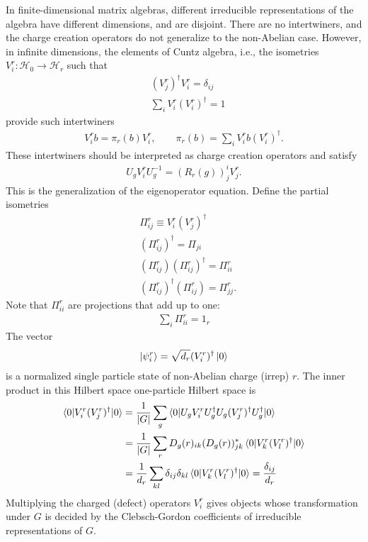 \documentclass{article}
\newcommand{\mH}{\mathcal{H}}
\newcommand{\nn}{\nonumber}
\theoremstyle{definition}
\begin{document}
  In finite-dimensional matrix algebras, different irreducible representations of
  the algebra have different dimensions, and are disjoint. There are no intertwiners,
  and the charge creation operators do not generalize to the non-Abelian case. However,
  in infinite dimensions, the elements of Cuntz algebra, i.e., the isometries $V_{i}^{r}:\mH_0\to \mH_r$ such that
  \begin{align}
  &(V^r_j)^\dagger V^r_i=\delta_{ij}\nn\\
  &\sum_i V^r_i (V^r_i)^\dagger=1
  \end{align}
   provide such intertwiners
  \begin{align}
    V_{i}^{r}b=\pi_{r}(b)V_{i}^{r},\qquad \pi_{r}(b)=\sum_{i}V_{i}^{r}b (V_{i}^{r})^{\dagger}.
  \end{align}
  These intertwiners should be interpreted as charge creation operators and satisfy
  \begin{align}
    U_{g}V_{i}^{r}U_{g}^{-1}=(R_{r}(g))^{i}_{j}V_{j}^{r}.
  \end{align}
  This is the generalization of the eigenoperator equation. Define the partial isometries 
  \begin{align}
      &\Pi_{ij}^r\equiv V^r_i (V^r_j)^\dagger\nn\\
      &(\Pi_{ij}^r)^\dagger=\Pi_{ji}\nn\\
      &(\Pi_{ij}^r)(\Pi_{ij}^r)^\dagger=\Pi_{ii}^r\nn\\
      &(\Pi_{ij}^r)^\dagger(\Pi_{ij}^r)=\Pi_{jj}^r.
  \end{align}
  Note that $\Pi_{ii}^r$ are projections that add up to one:
  \begin{align}
      \sum_i \Pi_{ii}^r=1_r
  \end{align}
   The vector 
  \begin{align}
      \ket{\psi^r_i}=\sqrt{d_r}(V^r_i)^\dagger\ket{0}
  \end{align}
  is a normalized single particle state of non-Abelian charge (irrep) $r$. The inner product in this Hilbert space one-particle Hilbert space is
  \begin{align}
      \braket{0|V^r_i (V^r_j)^\dagger|0}&=\frac{1}{|G|}\sum_g\braket{0|U_g V^r_i U_g^\dagger U_g(V^r_j)^\dagger U_g^\dagger|0}\nn\\
      &=\frac{1}{|G|}\sum_r D_g(r)_{ik}(D_g(r))^*_{jk}\braket{0|V_k^r (V^r_l)^\dagger|0}\nn\\
      &=\frac{1}{d_r}\sum_{kl}\delta_{ij}\delta_{kl}\braket{0|V_k^r (V^r_l)^\dagger|0}=\frac{\delta_{ij}}{d_r}
  \end{align}
Multiplying the charged (defect) operators $V^r_i$ gives objects whose transformation under $G$ is decided by the Clebsch-Gordon coefficients of irreducible representations of $G$.
  
\end{document}

